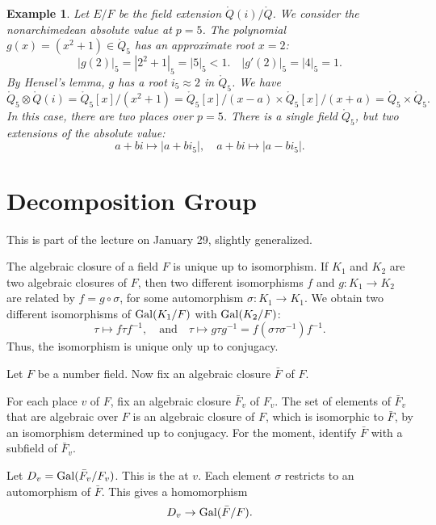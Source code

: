\documentclass{amsart}
\newtheorem{example}[exercise]{Example}
\def\abs#1{{|#1|}}
\begin{document}
\begin{example} Let $E/F$ be the field extension $\ring{Q}(i)/\ring{Q}$.
We consider the nonarchimedean absolute value at $p=5$.
The polynomial $g(x)=(x^2+1)\in\ring{Q}_5$ has an approximate root $x=2$:
\[
\abs{g(2)}_5=\abs{2^2 + 1}_5=\abs{5}_5 < 1.\quad \abs{g'(2)}_5 = \abs{4}_5=1.
\]
By Hensel's lemma, $g$ has a root $i_5\approx 2$ in $\ring{Q}_5$. We have
\[
\ring{Q}_5\otimes \ring{Q}(i) = \ring{Q}_5[x]/(x^2+1) = 
\ring{Q}_5[x]/(x - a)\times
\ring{Q}_5[x]/(x+a) = \ring{Q}_5\times\ring{Q}_5.
\]
In this case, there are two places over $p=5$.  There is a single field
$\ring{Q}_5$, but two extensions of the absolute value:
\[
a + b i \mapsto \abs{a + b i_5},\quad
a + b i \mapsto \abs{a - b i_5}.
\]
\end{example}



\newpage
\section{Decomposition Group}

This is part of the lecture on January 29, slightly generalized.

The algebraic closure of a field $F$ is unique up to isomorphism.
If $K_1$ and $K_2$ are two algebraic closures of $F$, then two different
isomorphisms $f$ and $g:K_1\to K_2$ are related by $f = g \circ \sigma$, for some 
automorphism $\sigma: K_1\to K_1$.  We obtain two different isomorphisms
of ${\operatorname{Gal}}(K_1/F)$ with ${\operatorname{Gal}}(K_2/F)$:
\[
\tau \mapsto f \tau f^{-1},\quad \text{and}\quad 
\tau\mapsto g\tau g^{-1} = f (\sigma\tau\sigma^{-1}) f^{-1}.
\]
Thus, the isomorphism is unique only up to conjugacy.  

Let $F$ be a number field.
Now fix an algebraic closure $\bar{F}$ of $F$.

For each place  $v$ of $F$, fix an algebraic closure $\bar{F}_v$ of
$F_v$.  The set of elements of $\bar{F}_v$ that are
algebraic over $F$ is an algebraic closure of $F$, which
is isomorphic to $\bar{F}$, by an isomorphism determined up to
conjugacy.  For the moment, identify $\bar{F}$ with a subfield
of $\bar{F}_v$.

Let $D_v = {\operatorname{Gal}}(\bar{F}_v/F_v)$.  This is the
 at $v$.  Each element $\sigma$ restricts
to an automorphism of $\bar{F}$.  This gives a homomorphism
\begin{equation}\label{eqn:Dp}
D_v\to {\operatorname{Gal}}(\bar{F}/F).
\end{equation}
\end{document}
